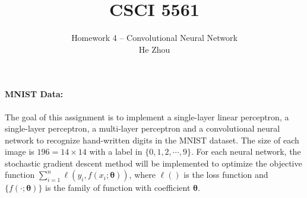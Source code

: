 \documentclass[11pt]{scrartcl}
\begin{document}
\title{CSCI 5561}
\author{\Large Homework 4 -- Convolutional Neural Network\\
	He Zhou}  %
\maketitle
\newpage
\paragraph{\textbf{MNIST Data: }}
The goal of this assignment is to implement a single-layer linear perceptron, a single-layer perceptron, a multi-layer perceptron and a convolutional neural network to recognize hand-written digits in the MNIST dataset. The size of each image is $196=14\times 14$ with a label in $\{0,1,2,\cdots, 9\}$. For each neural network, the stochastic gradient descent method will be implemented to optimize the objective function $\sum_{i=1}^{n}\ell(y_i,f(x_i;\bm{\theta}))$, 
where $\ell()$ is the loss function and $\{f(\cdot;\bm{\theta})\}$ is the family of function with coefficient $\bm{\theta}$.
\end{document}
